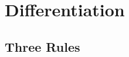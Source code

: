 \documentclass[french]{article}
\begin{document}
\section{Differentiation}

\subsection{Three Rules}


\end{document}
